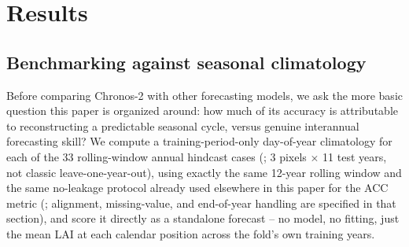 \documentclass[11pt]{article}
\begin{document}
\section{Results}
\label{sec:results}

\subsection{Benchmarking against seasonal climatology}
\label{sec:results-climatology}

Before comparing Chronos-2 with other forecasting models, we ask the more basic question this
paper is organized around: how much of its accuracy is attributable to reconstructing a
predictable seasonal cycle, versus genuine interannual forecasting skill? We compute a
training-period-only day-of-year climatology for each of the 33 rolling-window annual hindcast
cases (; 3 pixels $\times$ 11 test years, not classic leave-one-year-out),
using exactly the same 12-year rolling window and the same no-leakage protocol already used
elsewhere in this paper for the ACC metric (; alignment, missing-value,
and end-of-year handling are specified in that section), and score it directly as a standalone
forecast -- no model, no fitting, just the mean LAI at each calendar position across the fold's own
training years.
\end{document}
